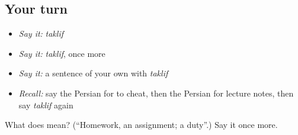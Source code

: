 \subsection*{Your turn}
\begin{itemize}
\raggedright
  \item \emph{Say it:} \emph{taklif}
  \item \emph{Say it:} \emph{taklif}, once more
  \item \emph{Say it:} a sentence of your own with \emph{taklif}
  \item \emph{Recall:} say the Persian for to cheat, then the Persian for lecture notes, then say \emph{taklif} again
\end{itemize}

\begin{tcolorbox}[breakable,colback=teal!4,colframe=teal!35!black,title={Before you move on}]
What does  mean? (\textquotedblleft{}Homework, an assignment; a duty\textquotedblright{}.) Say it once more.
\end{tcolorbox}
